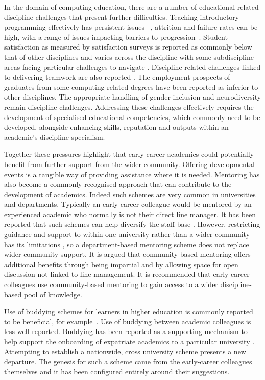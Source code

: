 \documentclass[sigconf]{acmart}
\begin{document}
In the domain of computing education, there are a number of
educational related discipline challenges that present further
difficulties. Teaching introductory programming effectively has
persistent issues
~\cite{davenport-et-al:latice2016,murphy-et-al:programming2017,simon-et-al:sigcse2018},
attrition and failure rates can be high, with a range of issues
impacting barriers to
progression~\cite{Watson:2014:FRI:2591708.2591749}. Student
satisfaction as measured by satisfaction surveys is reported as
commonly below that of other disciplines \cite{Sinclair2015} and
varies across the discipline with some subdiscipline areas facing
particular challenges to navigate \cite{Knutas2021}. Discipline
related challenges linked to delivering teamwork are also reported
\cite{Gordon2010,Phillips2021}. The employment prospects of graduates
from some computing related degrees have been reported as inferior to
other disciplines\cite{shadbolt2016shadbolt}. The appropriate handling
of gender inclusion \cite{Winter2021} and neurodiversity
\cite{Stuurman2109} remain discipline challenges. Addressing these
challenges effectively requires the development of specialised
educational competencies, which commonly need to be developed,
alongside enhancing skills, reputation and outputs within an
academic’s discipline specialism.

Together these pressures highlight that early career academics could
potentially benefit from further support from the wider
community. Offering developmental events is a tangible way of
providing assistance where it is needed. Mentoring has also become a
commonly recognised approach that can contribute to the development of
academics. Indeed such schemes are very common in universities and
departments. Typically an early-career colleague would be mentored by
an experienced academic who normally is not their direct line
manager. It has been reported that such schemes can help diversify the
staff base \cite{Golubchik2018}. However, restricting guidance and
support to within one university rather than a wider community has its
limitations \cite{Golubchik2018}, so a department-based mentoring
scheme does not replace wider community support.  It is argued that
community-based mentoring offers additional benefits through being
impartial and by allowing space for open discussion not linked to line
management. It is recommended that early-career colleagues use
community-based mentoring to gain access to a wider discipline-based
pool of knowledge.

Use of buddying schemes for learners in higher education is commonly
reported to be beneficial, for example~\cite{Hayes2020,May20}. Use of
buddying between academic colleagues is less well reported. Buddying
has been reported as a supporting mechanism to help support the
onboarding of expatriate academics to a particular university
\cite{Wilkins2019}. Attempting to establish a nationwide, cross
university scheme presents a new departure. The genesis for such a
scheme came from the early-career colleagues themselves and it has
been configured entirely around their suggestions.
	
\end{document}
